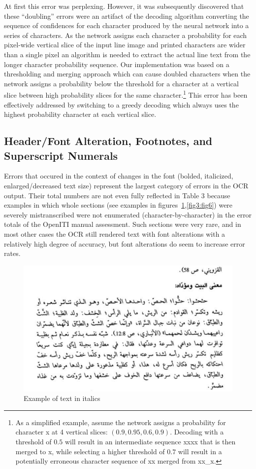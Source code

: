 At first this error was perplexing. However, it was subsequently discovered
that these “doubling” errors were an artifact of the decoding algorithm
converting the sequence of confidences for each character produced by the
neural network into a series of characters. As the network assigns each
character a probability for each pixel-wide vertical slice of the input line
image and printed characters are wider than a single pixel an algorithm is
needed to extract the actual line text from the longer character probability
sequence. Our implementation was based on a thresholding and merging approach
which can cause doubled characters when the network assigns a probability below
the threshold for a character at a vertical slice between high probability
slices for the same character.\footnote{As a simplified example, assume the
network assigns a probability for character x at 4 vertical slices: $(0.9, 0.95,
0.6, 0.9)$. Decoding with a threshold of $0.5$ will result in an intermediate
sequence xxxx that is then merged to x, while selecting a higher threshold of
$0.7$ will result in a potentially erroneous character sequence of xx merged from
xx\_x.} This error has been effectively addressed by switching to a greedy
decoding which always uses the highest probability character at each vertical
slice.

\subsection{Header/Font Alteration, Footnotes, and Superscript Numerals}

Errors that occured in the context of changes in the font (bolded, italicized,
enlarged/decreased text size) represent the largest category of errors in the
OCR output. Their total numbers are not even fully reflected in Table 3 because
examples in which whole sections (see examples in figures~\ref{fig3:fig5},\ref{fig3:fig6}) were severely
mistranscribed were not enumerated (character-by-character) in the error totals
of the OpenITI manual assessment. Such sections were very rare, and in most
other cases the OCR still rendered text with font alterations with a relatively
high degree of accuracy, but font alterations do seem to increase error rates.

\begin{figure}[h]
	\includegraphics[width=\linewidth]{images/image19.png}
	\caption{Example of text in italics}
	\label{fig3:fig5}
\end{figure}

